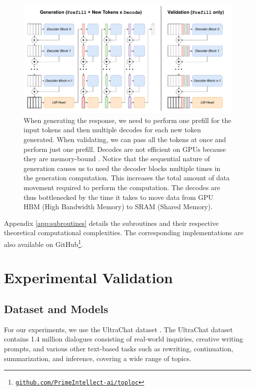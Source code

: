 \documentclass{article}
\theoremstyle{plain}
\theoremstyle{definition}
\theoremstyle{remark}
\begin{document}
\begin{figure}[ht]
  \includegraphics[width=\linewidth]{figures/PrefillDecode.pdf}
  \vspace{-16pt}
  \caption{When generating the response, we need to perform one prefill for the input tokens and then multiple decodes for each new token generated. When validating, we can pass all the tokens at once and perform just one prefill. Decodes are not efficient on GPUs because they are memory-bound \citep{chunked_prefill2}. Notice that the sequential nature of generation causes us to need the decoder blocks multiple times in the generation computation. This increases the total amount of data movement required to perform the computation. The decodes are thus bottlenecked by the time it takes to move data from GPU HBM (High Bandwidth Memory) to SRAM (Shared Memory).}
  \label{fig:decode_prefill}
\end{figure}

Appendix \ref{app:subroutines} details the subroutines and their respective theoretical computational complexities.
The corresponding implementations are also available on GitHub\footnote{\href{https://github.com/PrimeIntellect-ai/toploc}{\texttt{github.com/PrimeIntellect-ai/toploc}}}.

\section{Experimental Validation}

\subsection{Dataset and Models}
For our experiments, we use the UltraChat dataset \citep{ultrachat2023}.
The UltraChat dataset contains 1.4 million dialogues consisting of real-world inquiries, creative writing prompts, and various other text-based tasks such as rewriting, continuation, summarization, and inference, covering a wide range of topics.
\end{document}
